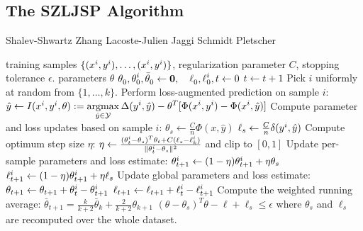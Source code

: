 \subsection{The SZLJSP Algorithm}
\begin{algorithm*}[t]
    \caption{Shalev-Shwartz Zhang Lacoste-Julien Jaggi Schmidt Pletscher\label{alg_szljsp}}
    \begin{doublespacing}
    \begin{algorithmic}[1]
        \Require training samples $\{ (x^{i}, y^{i}), \dots, (x^{i}, y^{i})\}$, regularization parameter $C$, stopping tolerance $\epsilon$.
        \Ensure parameters $\theta$
        \State  $\displaystyle \theta_0^{\vphantom{i}}, \theta_0^{i}, \bar{\theta}_0^{\vphantom{i}} \leftarrow \mathbf{0},\quad \ell_0^{\vphantom{i}}, \ell_0^{i}, t \leftarrow 0 $
        \Repeat
            \State $t \leftarrow t + 1$
            \State Pick $i$ uniformly at random from $\{1, \dotsc, k\}$.
            \State Perform loss-augmented prediction on sample $i$:
            \Statex[2]   $\hat{y} \leftarrow I(x^{i}, y^{i}, \theta) := \displaystyle \operatorname*{argmax}_{\hat{y}\in\mathcal{Y}} \Delta(y^{i}, \hat{y}) - \theta^T [\Phi(x^{i}, y^{i}) - \Phi(x^{i}, \hat{y})]$
            \State Compute parameter and loss updates based on sample $i$:
            \Statex[2]     $\theta_s \leftarrow \frac{C}{n} \Phi(x, \hat{y})$
            \Statex[2]     $\ell_s \leftarrow \frac{C}{n} \delta(y^{i}, \hat{y})$
            \State Compute optimum step size $\eta$:
            \Statex[2]    $\eta \leftarrow \frac{(\theta_t^{i} - \theta_s)^T \theta_t + C (\ell_s - \ell_k^{i} )}{\lVert \theta_t^{i} - \theta_s \rVert^2}$ and clip to $[0, 1]$
            \State Update per-sample parameters and loss estimate:
            \Statex[2]    $\theta_{t+1}^{i} \leftarrow (1 - \eta) \theta_{t+1}^{i} + \eta \theta_s$
            \Statex[2]    $\ell_{t+1}^{i} \leftarrow (1 - \eta) \theta_{t+1}^{i} + \eta \ell_s$
            \State Update global parameters and loss estimate:
            \Statex[2]   $\theta_{t+1} \leftarrow \theta_{t+1} + \theta_{t}^{i} - \theta_{t+1}^{i}$
            \Statex[2]   $\ell_{t+1} \leftarrow \ell_{t+1} + \ell_{t}^{i} - \ell_{t+1}^{i}$
            \State Compute the weighted running average:
            \Statex[2] $\bar{\theta}_{t+1} = \frac{k}{k + 2} \bar{\theta}_k + \frac{2}{k + 2}\theta_{k+1}$
        \Until $(\theta - \theta_s)^T\theta - \ell + \ell_s \leq \epsilon$
        \Statex where $\theta_s$ and $\ell_s$ are recomputed over the whole dataset.
    \end{algorithmic}
    \end{doublespacing}
\end{algorithm*}

